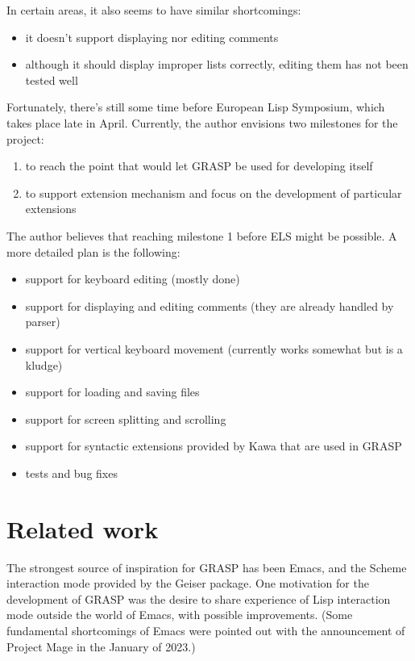 \documentclass[sigconf]{acmart}
\begin{document}
In certain areas, it also seems to have similar
shortcomings:
\begin{itemize}
\item it doesn't support displaying nor editing
comments
\item although it should display improper lists correctly, 
editing them has not been tested well
\end{itemize}

Fortunately, there's still some time before
European Lisp Symposium, which takes place late
in April. Currently, the author envisions two
milestones for the project:
\begin{enumerate}
\item to reach the point that would let GRASP
be used for developing itself
\item to support extension mechanism and focus
on the development of particular extensions
\end{enumerate}

The author believes that reaching milestone 1
before ELS might be possible. A more detailed
plan is the following:
\begin{itemize}
\item support for keyboard editing (mostly done)
\item support for displaying and editing comments
(they are already handled by parser)
\item support for vertical keyboard movement
(currently works somewhat but is a kludge)
\item support for loading and saving files
\item support for screen splitting and scrolling
\item support for syntactic extensions provided
by Kawa that are used in GRASP
\item tests and bug fixes
\end{itemize}

\section{Related work}

The strongest source of inspiration for GRASP
has been Emacs\cite{Stallman}, and the Scheme interaction
mode provided by the Geiser package. One
motivation for the development of GRASP was
the desire to share experience of Lisp interaction
mode outside the world of Emacs, with possible
improvements. (Some fundamental shortcomings
of Emacs were pointed out with the announcement
of Project Mage in the January of 2023\cite{Korobeinikov}.)
\end{document}
